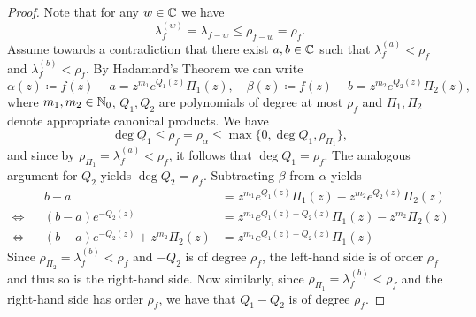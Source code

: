 \begin{proof}
    Note that for any $w \in \mathbb{C}$ we have
    $$ \lambda_f^{(w)} = \lambda_{f-w} \leq \rho_{f-w} = \rho_f. $$
    Assume towards a contradiction that there exist $a, b \in \mathbb{C}$ such that $\lambda_f^{(a)} < \rho_f$ and $\lambda_f^{(b)} < \rho_f$. By Hadamard's Theorem we can write
    $$ \alpha(z) \coloneqq f(z) - a = z^{m_1} e^{Q_1(z)} \Pi_1(z), \quad \beta(z) \coloneqq f(z) - b = z^{m_2} e^{Q_2(z)} \Pi_2(z), $$
    where $m_1, m_2 \in \mathbb{N}_0$, $Q_1, Q_2$ are polynomials of degree at most $\rho_f$ and $\Pi_1, \Pi_2$ denote appropriate canonical products. We have
    $$ \deg Q_1 \leq \rho_f = \rho_\alpha \leq \max \{ 0, \deg Q_1, \rho_{\Pi_1} \}, $$
    and since by  $\rho_{\Pi_1} = \lambda_f^{(a)} < \rho_f$, it follows that $\deg Q_1 = \rho_f$. The analogous argument for $Q_2$ yields $\deg Q_2 = \rho_f$. Subtracting $\beta$ from $\alpha$ yields
    \begin{equation} \label{thm:existence-borel-exceptional-values:difference-of-functions}
    \begin{aligned}
                        && b - a &= z^{m_1} e^{Q_1(z)} \Pi_1(z) - z^{m_2} e^{Q_2(z)} \Pi_2(z) \\
        \Leftrightarrow && (b - a) e^{-Q_2(z)} &= z^{m_1} e^{Q_1(z) - Q_2(z)} \Pi_1(z) - z^{m_2} \Pi_2(z) \\
        \Leftrightarrow && (b - a) e^{-Q_2(z)} + z^{m_2} \Pi_2(z) &= z^{m_1} e^{Q_1(z) - Q_2(z)} \Pi_1(z)
    \end{aligned}
    \end{equation}
    Since $\rho_{\Pi_2} = \lambda_f^{(b)} < \rho_f$ and $-Q_2$ is of degree $\rho_f$, the left-hand side is of order $\rho_f$ and thus so is the right-hand side. Now similarly, since $\rho_{\Pi_1} = \lambda_f^{(b)} < \rho_f$ and the right-hand side has order $\rho_f$, we have that $Q_1 - Q_2$ is of degree $\rho_f$.
    

\end{proof}
